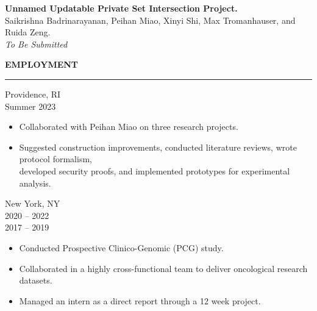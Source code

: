 \documentclass{resume} %
\begin{document}
\hspace*{1mm} {\bf \color{blue} Unnamed Updatable Private Set Intersection Project.} \\
\hspace*{1mm} Saikrishna Badrinarayanan, Peihan Miao, Xinyi Shi, Max Tromanhauser, and Ruida Zeng. \\
\hspace*{1mm} {\em To Be Submitted} %


\medskip
\MakeUppercase{{\bf Employment}}
\medskip
\hrule

\hspace*{1mm}{\bf Brown University } \hfill Providence, RI \\
\hspace*{1mm}{\em Research Assistant} \hfill Summer 2023
\begin{itemize}[nosep, topsep=-5mm, label=-]
    \item Collaborated with Peihan Miao on three research projects.
    \item Suggested construction improvements, conducted literature reviews, wrote protocol formalism, \\
    developed security proofs, and implemented prototypes for experimental analysis.
\end{itemize}
\vspace{5mm}

\hspace*{1mm}{\bf Flatiron Health } \hfill New York, NY \\
\hspace*{1mm}{\em Senior Software Engineer, Clinical Research } \hfill 2020 -- 2022 \\
\hspace*{1mm}{\em Software Engineer, Real World Evidence } \hfill 2017 -- 2019
\begin{itemize}[nosep, topsep=-5mm, label=-]
    \item Conducted Prospective Clinico-Genomic (PCG) study.
    \item Collaborated in a highly cross-functional team to deliver oncological research datasets.
    \item Managed an intern as a direct report through a 12 week project.
\end{itemize}
\vspace{5mm}
\end{document}
